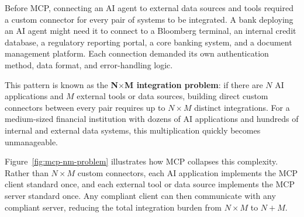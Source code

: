 \documentclass{article}
\begin{document}
Before MCP, connecting an AI agent to external data sources and tools required a custom connector for every pair of systems to be integrated. A bank deploying an AI agent might need it to connect to a Bloomberg terminal, an internal credit database, a regulatory reporting portal, a core banking system, and a document management platform. Each connection demanded its own authentication method, data format, and error-handling logic.

This pattern is known as the \textbf{N$\times$M integration problem}: if there are $N$ AI applications and $M$ external tools or data sources, building direct custom connectors between every pair requires up to $N \times M$ distinct integrations. For a medium-sized financial institution with dozens of AI applications and hundreds of internal and external data systems, this multiplication quickly becomes unmanageable.

Figure~\ref{fig:mcp-nm-problem} illustrates how MCP collapses this complexity. Rather than $N \times M$ custom connectors, each AI application implements the MCP client standard once, and each external tool or data source implements the MCP server standard once. Any compliant client can then communicate with any compliant server, reducing the total integration burden from $N \times M$ to $N + M$.
\end{document}

